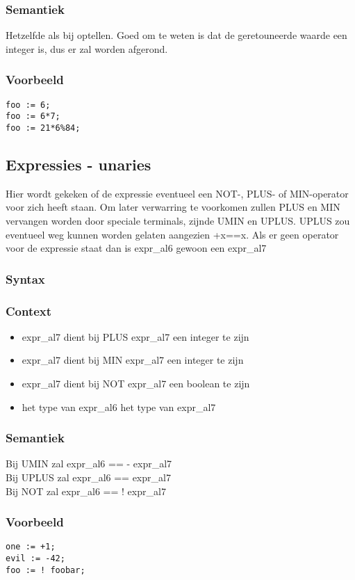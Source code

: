 \documentclass[]{article}
\begin{document}
\subsubsection{Semantiek}
Hetzelfde als bij optellen. Goed om te weten is dat de geretouneerde waarde een integer is, dus er zal worden afgerond.
\subsubsection{Voorbeeld}
\begin{lstlisting}[style=SELMA]
foo := 6;
foo := 6*7;
foo := 21*6%84;
\end{lstlisting}


\subsection{Expressies - unaries}
Hier wordt gekeken of de expressie eventueel een NOT-, PLUS- of MIN-operator voor zich heeft staan.
Om later verwarring te voorkomen zullen PLUS en MIN vervangen worden door speciale terminals, zijnde UMIN en UPLUS. UPLUS zou eventueel weg kunnen worden gelaten aangezien +x==x.
Als er geen operator voor de expressie staat dan is expr\_al6 gewoon een expr\_al7
\subsubsection{Syntax}

\subsubsection{Context}
\begin{itemize}
\item expr\_al7 dient bij PLUS expr\_al7 een integer te zijn
\item expr\_al7 dient bij MIN expr\_al7 een integer te zijn
\item expr\_al7 dient bij NOT expr\_al7 een boolean te zijn
\item het type van expr\_al6 het type van expr\_al7
\end{itemize}
\subsubsection{Semantiek}
Bij UMIN zal expr\_al6 == - expr\_al7 \\
Bij UPLUS zal expr\_al6 == expr\_al7 \\
Bij NOT zal expr\_al6 == ! expr\_al7 
\subsubsection{Voorbeeld}
\begin{lstlisting}[style=SELMA]
one := +1;
evil := -42;
foo := ! foobar;
\end{lstlisting}
\end{document}
